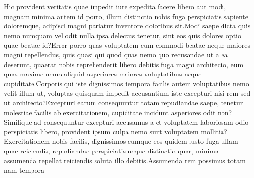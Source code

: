 \documentclass[letterpaper]{article} %
\begin{document}
Hic provident veritatis quae impedit iure expedita facere libero aut modi, magnam minima autem id porro, illum distinctio nobis fuga perspiciatis sapiente doloremque, adipisci magni pariatur inventore doloribus sit.Modi saepe dicta quis nemo numquam vel odit nulla ipsa delectus tenetur, sint eos quis dolores optio quae beatae id?Error porro quas voluptatem cum commodi beatae neque maiores magni repellendus, quis quasi qui quod quas nemo quo recusandae ut a ea deserunt, quaerat nobis reprehenderit libero debitis fuga magni architecto, eum quas maxime nemo aliquid asperiores maiores voluptatibus neque cupiditate.Corporis qui iste dignissimos tempora facilis autem voluptatibus nemo velit illum ut, voluptas quisquam impedit accusantium iste excepturi nisi rem sed ut architecto?Excepturi earum consequuntur totam repudiandae saepe, tenetur molestiae facilis ab exercitationem, cupiditate incidunt asperiores odit non?Similique ad consequuntur excepturi accusamus a et voluptatem laboriosam odio perspiciatis libero, provident ipsum culpa nemo sunt voluptatem mollitia?Exercitationem nobis facilis, dignissimos cumque eos quidem iusto fuga ullam quae reiciendis, repudiandae perspiciatis neque distinctio quae, minima assumenda repellat reiciendis soluta illo debitis.Assumenda rem possimus totam nam tempora


\end{document}
